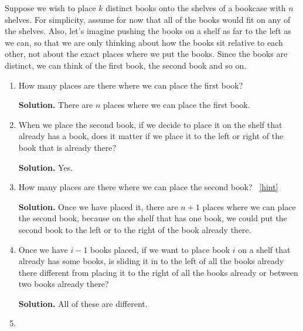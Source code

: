 \documentclass{book}
\begin{document}
\setcounter{project}{124}
\addtocounter{project}{-1}
\begin{activity}[]\label{bookcase}
\hypertarget{p-871}{}%
Suppose we wish to place \(k\) distinct books onto the shelves of a bookcase with \(n\) shelves. For simplicity, assume for now that all of the books would fit on any of the shelves. Also, let's imagine pushing the books on a shelf as far to the left as we can, so that we are only thinking about how the books sit relative to each other, not about the exact places where we put the books. Since the books are distinct, we can think of the first book, the second book and so on.%
\begin{enumerate}[font=\bfseries,label=(\alph*),ref=\alph*]
\item\label{task-164} \hypertarget{p-872}{}%
How many places are there where we can place the first book?%
\par\smallskip%
\noindent\textbf{Solution.}\hypertarget{solution-90}{}\quad%
\hypertarget{p-873}{}%
There are \(n\) places where we can place the first book.%
\item\label{task-165} \hypertarget{p-874}{}%
When we place the second book, if we decide to place it on the shelf that already has a book, does it matter if we place it to the left or right of the book that is already there?%
\par\smallskip%
\noindent\textbf{Solution.}\hypertarget{solution-91}{}\quad%
\hypertarget{p-875}{}%
Yes.%
\item\label{task-166} \hypertarget{p-876}{}%
How many places are there where we can place the second book?%
~\hfill{\tiny\hyperlink{a-124.c}{[hint]}\hypertarget{q-124.c}{}}\par\smallskip%
\noindent\textbf{Solution.}\hypertarget{solution-92}{}\quad%
\hypertarget{p-878}{}%
Once we have placed it, there are \(n+1\) places where we can place the second book, because on the shelf that has one book, we could put the second book to the left or to the right of the book already there.%
\item\label{task-167} \hypertarget{p-879}{}%
Once we have \(i-1\) books placed, if we want to place book \(i\)  on a shelf that already has some books, is sliding it in to the left of all the books already there different from placing it to the right of all the books already or between two books already there?%
\par\smallskip%
\noindent\textbf{Solution.}\hypertarget{solution-93}{}\quad%
\hypertarget{p-880}{}%
All of these are different.%
\item\label{task-168} \hypertarget{p-881}{}%

\end{enumerate}
\end{activity}
\end{document}

